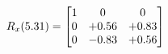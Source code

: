\documentclass[preview]{standalone}
\begin{document}
\begin{align*}
\special{dvisvgm:raw <g id='unique000'>}R_{x}(5.31) = \begin{bmatrix}1 & 0 & 0 \\0 & +0.56 & +0.83 \\0 & -0.83 & +0.56\end{bmatrix}\special{dvisvgm:raw </g>}
\end{align*}
\end{document}
